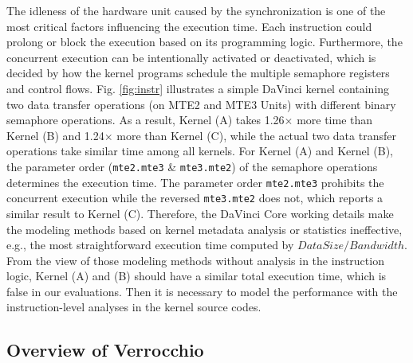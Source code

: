 The idleness of the hardware unit caused by the synchronization is one of the most critical factors influencing the execution time. Each instruction could prolong or block the execution based on its programming logic. Furthermore, the concurrent execution can be intentionally activated or deactivated, which is decided by how the kernel programs schedule the multiple semaphore registers and control flows. Fig. \ref{fig:instr} illustrates a simple DaVinci kernel containing two data transfer operations (on MTE2 and MTE3 Units) with different binary semaphore operations. As a result, Kernel (A) takes 1.26$\times$ more time than Kernel (B) and 1.24$\times$ more than Kernel (C), while the actual two data transfer operations take similar time among all kernels. 
For Kernel (A) and Kernel (B), the parameter order (\verb|mte2.mte3| \& \verb|mte3.mte2|) of the semaphore operations determines the execution time. The parameter order \verb|mte2.mte3| prohibits the concurrent execution while the reversed \verb|mte3.mte2| does not, which reports a similar result to Kernel (C).
Therefore, the DaVinci Core working details make the modeling methods based on kernel metadata analysis or statistics ineffective, e.g., the most straightforward execution time computed by $DataSize / Bandwidth$. From the view of those modeling methods without analysis in the instruction logic, Kernel (A) and (B) should have a similar total execution time, which is false in our evaluations. Then it is necessary to model the performance with the instruction-level analyses in the kernel source codes.

\subsection{Overview of Verrocchio}

\begin{figure}[htbp]
\end{figure}

